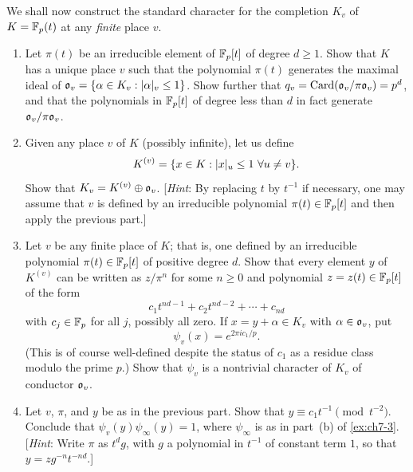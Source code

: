\begin{exercise}[5]
  \label{ex:ch7-5}
  We shall now construct the standard character for the completion $K_v$ of
  $K = \mathbb{F}_p(t)$ at any \emph{finite} place $v$.
  \begin{enumerate}[label=(\alph*)]
    \item Let $\pi(t)$ be an irreducible element of $\mathbb{F}_p[t]$ of degree
      $d \ge 1$. Show that $K$ has a unique place $v$ such that the polynomial
      $\pi(t)$ generates the maximal ideal of
      $\mathfrak{o}_v = \{\alpha \in K_v : \lvert\alpha\rvert_v \le 1\}$. Show further
      that $q_v = \operatorname{Card}(\mathfrak{o}_v/\pi\mathfrak{o}_v) = p^d$, and that
      the polynomials in $\mathbb{F}_p[t]$ of degree less than $d$ in fact generate
      $\mathfrak{o}_v/\pi\mathfrak{o}_v$.
    \item Given any place $v$ of $K$ (possibly infinite), let us define
      \[
        K^{(v)} = \{x \in K : \lvert x\rvert_u \le 1 \ \forall u \neq v\}.
      \]
      Show that $K_v = K^{(v)} \oplus \mathfrak{o}_v$. [\emph{Hint}: By replacing
      $t$ by $t^{-1}$ if necessary, one may assume that $v$ is defined by an
      irreducible polynomial $\pi(t) \in \mathbb{F}_p[t]$ and then apply the previous
      part.]
    \item Let $v$ be any finite place of $K$; that is, one defined by an
      irreducible polynomial $\pi(t) \in \mathbb{F}_p[t]$ of positive degree $d$.
      Show that every element $y$ of $K^{(v)}$ can be written as $z/\pi^n$
      for some $n \ge 0$ and polynomial $z = z(t) \in \mathbb{F}_p[t]$ of the form
      \[
        c_1 t^{nd-1} + c_2 t^{nd-2} + \cdots + c_{nd}
      \]
      with $c_j \in \mathbb{F}_p$ for all $j$, possibly all zero. If
      $x = y + \alpha \in K_v$ with $\alpha \in \mathfrak{o}_v$, put
      \[
        \psi_v(x) = e^{2\pi i c_1/p}.
      \]
      (This is of course well-defined despite the status of $c_1$ as a residue
      class modulo the prime $p$.) Show that $\psi_v$ is a nontrivial
      character of $K_v$ of conductor $\mathfrak{o}_v$.
    \item Let $v$, $\pi$, and $y$ be as in the previous part. Show that
      $y \equiv c_1 t^{-1} \pmod{t^{-2}}$. Conclude that
      $\psi_v(y)\psi_\infty(y) = 1$, where $\psi_\infty$ is as in part~(b) of
      \cref{ex:ch7-3}. [\emph{Hint}: Write $\pi$ as $t^d g$, with $g$ a
      polynomial in $t^{-1}$ of constant term $1$, so that
      $y = z g^{-n} t^{-nd}$.]
  \end{enumerate}
\end{exercise}

